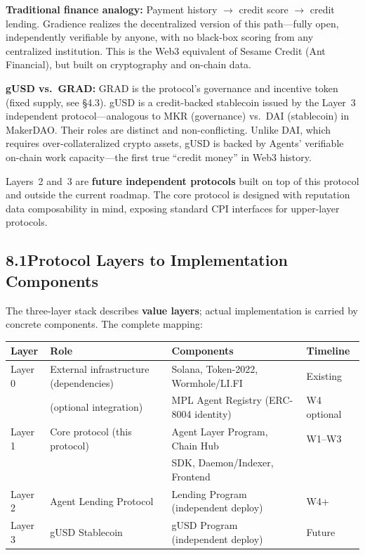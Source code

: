 \documentclass[11pt,a4paper]{article}
\begin{document}
\textbf{Traditional finance analogy:} Payment history $\to$ credit score $\to$ credit lending. Gradience realizes the decentralized version of this path---fully open, independently verifiable by anyone, with no black-box scoring from any centralized institution. This is the Web3 equivalent of Sesame Credit (Ant Financial), but built on cryptography and on-chain data.

\textbf{gUSD vs.\ GRAD:} GRAD is the protocol's governance and incentive token (fixed supply, see §4.3). gUSD is a credit-backed stablecoin issued by the Layer~3 independent protocol---analogous to MKR (governance) vs.\ DAI (stablecoin) in MakerDAO. Their roles are distinct and non-conflicting. Unlike DAI, which requires over-collateralized crypto assets, gUSD is backed by Agents' verifiable on-chain work capacity---the first true ``credit money'' in Web3 history.

Layers~2 and~3 are \textbf{future independent protocols} built on top of this protocol and outside the current roadmap. The core protocol is designed with reputation data composability in mind, exposing standard CPI interfaces for upper-layer protocols.

\subsection*{8.1\quad Protocol Layers to Implementation Components}

The three-layer stack describes \textbf{value layers}; actual implementation is carried by concrete components. The complete mapping:

\begin{center}
\renewcommand{\arraystretch}{1.3}
\begin{tabular}{llll}
\hline
\textbf{Layer} & \textbf{Role} & \textbf{Components} & \textbf{Timeline} \\
\hline
Layer 0 & External infrastructure (dependencies) & Solana, Token-2022, Wormhole/LI.FI & Existing \\
        & (optional integration) & MPL Agent Registry (ERC-8004 identity) & W4 optional \\
Layer 1 & Core protocol (this protocol) & Agent Layer Program, Chain Hub & W1--W3 \\
        & & SDK, Daemon/Indexer, Frontend & \\
Layer 2 & Agent Lending Protocol & Lending Program (independent deploy) & W4+ \\
Layer 3 & gUSD Stablecoin & gUSD Program (independent deploy) & Future \\
\hline
\end{tabular}
\end{center}
\end{document}
